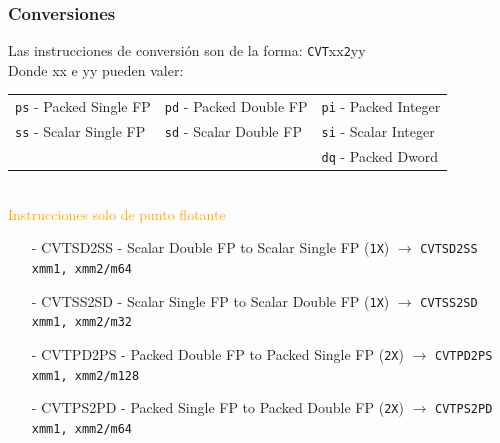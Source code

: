 \documentclass[aspectratio=169]{beamer}
\begin{document}
\begin{frame}[fragile]
	\frametitle{Conversiones}
	Las instrucciones de conversión son de la forma:
	\texttt{{\color{a}CVT}}\textcolor{v}{xx}\texttt{{\color{orange}2}}\textcolor{v}{yy} \\
	\vskip 5pt
	\footnotesize
	Donde \textcolor{v}{xx} e \textcolor{v}{yy} pueden valer:\\
	\vskip 5pt
	\begin{tabular}[h!]{l|l|l}
	\centering
	\texttt{ps} - Packed Single FP  & \texttt{pd} - Packed Double FP & \texttt{pi} - Packed Integer \\
	\texttt{ss} - Scalar Single FP  & \texttt{sd} - Scalar Double FP & \texttt{si} - Scalar Integer \\
	                                &                                & \texttt{dq} - Packed Dword   \\
	\end{tabular}
	\pause
	\vspace{1cm}\\
	\normalsize \textcolor{orange}{Instrucciones solo de punto flotante}\\
	\vspace{0.2cm}
	\footnotesize
	\begin{itemize}
	\item[-] {\color{a}CVT}{\color{v}SD}{\color{orange}2}{\color{v}SS} - Scalar Double FP to Scalar Single FP (\texttt{1X}) $\rightarrow$
	\textcolor{verdeuca}{\texttt{CVTSD2SS xmm1, xmm2/m64}}
	\item[-] {\color{a}CVT}{\color{v}SS}{\color{orange}2}{\color{v}SD} - Scalar Single FP to Scalar Double FP (\texttt{1X}) $\rightarrow$
	\textcolor{verdeuca}{\texttt{CVTSS2SD xmm1, xmm2/m32}}
	\end{itemize}
	\pause
	\begin{itemize}
	\item[-] {\color{a}CVT}{\color{v}PD}{\color{orange}2}{\color{v}PS} - Packed Double FP to Packed Single FP (\texttt{2X}) $\rightarrow$
	\textcolor{verdeuca}{\texttt{CVTPD2PS xmm1, xmm2/m128}}
	\item[-] {\color{a}CVT}{\color{v}PS}{\color{orange}2}{\color{v}PD} - Packed Single FP to Packed Double FP (\texttt{2X}) $\rightarrow$
	\textcolor{verdeuca}{\texttt{CVTPS2PD xmm1, xmm2/m64}}
	\end{itemize}
\end{frame}
\end{document}
